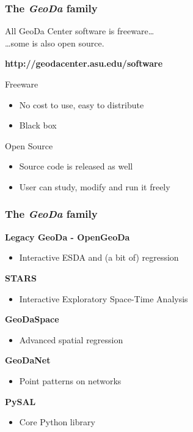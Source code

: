 \documentclass[nototal]{beamer}
\begin{document}
\begin{frame}
	\frametitle{The \textit{GeoDa} family}
 All GeoDa Center software is freeware\dots \\ \qquad\qquad\qquad\qquad\qquad\dots some is also open source.
  \vspace{0.5cm}
  \begin{LARGE}
  \textbf{http://geodacenter.asu.edu/software}
  \end{LARGE}
  \vspace{0.5cm}
 
\begin{block}{Freeware}
 \begin{itemize}
 \item  No cost to use, easy to distribute
 \item  Black box
 \end{itemize}
 \end{block} 
\begin{block}{Open Source}
 \begin{itemize}
 \item  Source code is released as well
 \item  User can study, modify and run it freely
 \end{itemize}
 \end{block} \end{frame} 

\begin{frame}
	\frametitle{The \textit{GeoDa} family}
 \textbf{Legacy GeoDa - OpenGeoDa}
 \begin{itemize}
 \item  Interactive ESDA and (a bit of) regression
 \end{itemize}
 \textbf{STARS}
 \begin{itemize}
 \item  Interactive Exploratory Space-Time Analysis
 \end{itemize}
 \textbf{GeoDaSpace}
 \begin{itemize}
 \item  Advanced spatial regression
 \end{itemize}
 \textbf{GeoDaNet}
 \begin{itemize}
 \item  Point patterns on networks
 \end{itemize}
 \textbf{PySAL}
 \begin{itemize}
 \item  Core Python library
 \end{itemize}
 \end{frame} 
\end{document}
